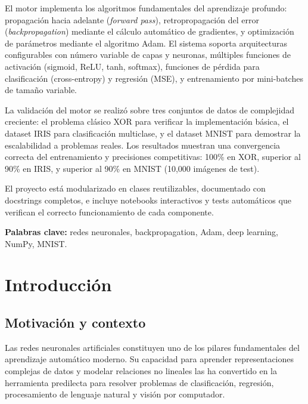 \documentclass[a4paper,11pt]{article}
\begin{document}
El motor implementa los algoritmos fundamentales del aprendizaje profundo: propagación hacia adelante (\textit{forward pass}), retropropagación del error (\textit{backpropagation}) mediante el cálculo automático de gradientes, y optimización de parámetros mediante el algoritmo Adam. El sistema soporta arquitecturas configurables con número variable de capas y neuronas, múltiples funciones de activación (sigmoid, ReLU, tanh, softmax), funciones de pérdida para clasificación (cross-entropy) y regresión (MSE), y entrenamiento por mini-batches de tamaño variable.

La validación del motor se realizó sobre tres conjuntos de datos de complejidad creciente: el problema clásico XOR para verificar la implementación básica, el dataset IRIS para clasificación multiclase, y el dataset MNIST para demostrar la escalabilidad a problemas reales. Los resultados muestran una convergencia correcta del entrenamiento y precisiones competitivas: 100\% en XOR, superior al 90\% en IRIS, y superior al 90\% en MNIST (10,000 imágenes de test).

El proyecto está modularizado en clases reutilizables, documentado con docstrings completos, e incluye notebooks interactivos y tests automáticos que verifican el correcto funcionamiento de cada componente.

\textbf{Palabras clave:} redes neuronales, backpropagation, Adam, deep learning, NumPy, MNIST.

\newpage
\tableofcontents

\newpage
\section{Introducción}

\subsection{Motivación y contexto}

Las redes neuronales artificiales constituyen uno de los pilares fundamentales del aprendizaje automático moderno. Su capacidad para aprender representaciones complejas de datos y modelar relaciones no lineales las ha convertido en la herramienta predilecta para resolver problemas de clasificación, regresión, procesamiento de lenguaje natural y visión por computador.
\end{document}
